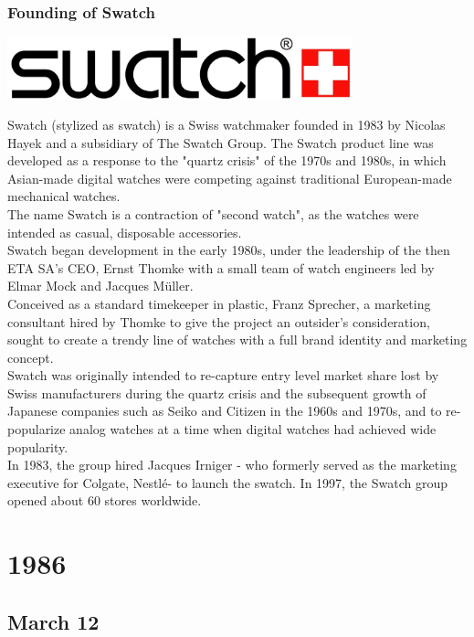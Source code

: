 \documentclass[11pt]{report}
\begin{document}
\subsection{Founding of Swatch}
\vspace{2mm}\begin{center}\includegraphics[width=10cm]{./img/swatchLogo.jpg}\end{center}
Swatch (stylized as swatch) is a Swiss watchmaker founded in 1983 by Nicolas Hayek and a subsidiary of The Swatch Group. The Swatch product line was developed as a response to the "quartz crisis" of the 1970s and 1980s, in which Asian-made digital watches were competing against traditional European-made mechanical watches.\\
\indent The name Swatch is a contraction of "second watch", as the watches were intended as casual, disposable accessories.\\
\indent Swatch began development in the early 1980s, under the leadership of the then ETA SA's CEO, Ernst Thomke with a small team of watch engineers led by Elmar Mock and Jacques Müller.\\
\indent Conceived as a standard timekeeper in plastic, Franz Sprecher, a marketing consultant hired by Thomke to give the project an outsider's consideration, sought to create a trendy line of watches with a full brand identity and marketing concept.\\
\indent Swatch was originally intended to re-capture entry level market share lost by Swiss manufacturers during the quartz crisis and the subsequent growth of Japanese companies such as Seiko and Citizen in the 1960s and 1970s, and to re-popularize analog watches at a time when digital watches had achieved wide popularity.\\
\indent In 1983, the group hired Jacques Irniger - who formerly served as the marketing executive for Colgate, Nestlé- to launch the swatch.
In 1997, the Swatch group opened about 60 stores worldwide.

\chapter{1986}
\section{March 12}
\end{document}
